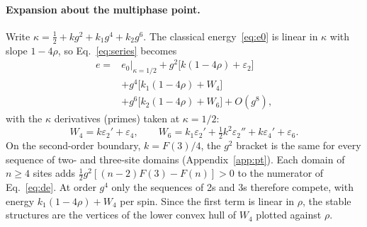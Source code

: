 \paragraph*{Expansion about the multiphase point.}
Write $\kappa=\tfrac12+kg^2+k_1g^4+k_2g^6$. The classical energy~\eqref{eq:e0} is linear in $\kappa$ with
slope $1-4\rho$, so Eq.~\eqref{eq:series} becomes
\begin{align}
e={}&e_0\big|_{\kappa=1/2}+g^2\big[k(1-4\rho)+\varepsilon_2\big]\nonumber\\
&+g^4\big[k_1(1-4\rho)+W_4\big]\nonumber\\
&+g^6\big[k_2(1-4\rho)+W_6\big]+O(g^8),
\label{eq:expand}
\end{align}
with the $\kappa$ derivatives (primes) taken at $\kappa=1/2$:
\begin{equation}
W_4=k\varepsilon_2'+\varepsilon_4,\qquad
W_6=k_1\varepsilon_2'+\tfrac12k^2\varepsilon_2''+k\varepsilon_4'+\varepsilon_6 .
\label{eq:W}
\end{equation}
On the second-order boundary, $k=F(3)/4$, the $g^2$ bracket is the same for every sequence of two- and
three-site domains (Appendix~\ref{app:pt}). Each domain of $n\ge4$ sites adds $\tfrac12g^2[(n-2)F(3)-F(n)]>0$
to the numerator of Eq.~\eqref{eq:de}.
At order $g^4$ only the sequences of 2s and 3s therefore compete, with energy
$k_1(1-4\rho)+W_4$ per spin. Since the first term is linear in $\rho$, the stable structures are the vertices
of the lower convex hull of $W_4$ plotted against $\rho$.

